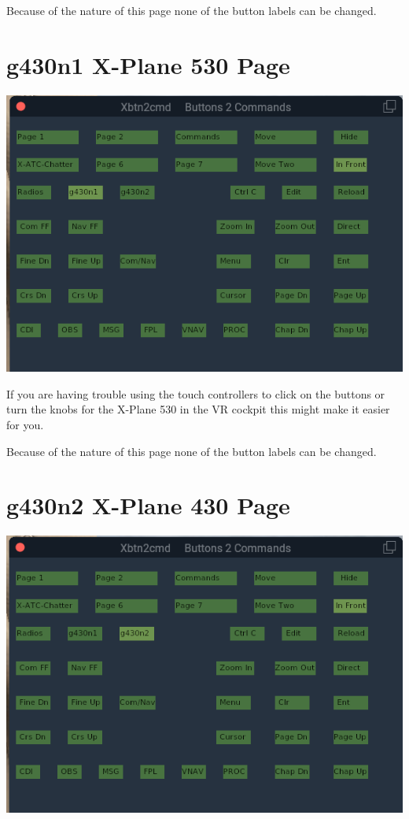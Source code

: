 \documentclass[11pt,parskip=half,a4paper]{scrartcl}
\begin{document}
Because of the nature of this page none of the button labels can be changed.

\newpage
\section{g430n1 X-Plane 530 Page}

\begin{center}
\includegraphics[width=15cm]{Xbtn2cmd_g430n1_530_Page.png}
\end{center}

If you are having trouble using the touch controllers to click on the buttons or turn the knobs for the X-Plane 530 in the VR cockpit this might make it easier for you. \newline

Because of the nature of this page none of the button labels can be changed.

\newpage
\section{g430n2 X-Plane 430 Page}

\begin{center}
\includegraphics[width=15cm]{Xbtn2cmd_g430n2_430_Page.png}
\end{center} 
\end{document}
